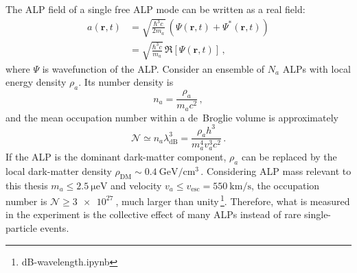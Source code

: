 The ALP field of a single free ALP mode can be written as a real field: 
\begin{align}
     a(\mathbf{r},t)
     &=\sqrt{\frac{\hbar^3c}{2 m_a}}\,
      \left(\Psi(\mathbf{r},t) + \Psi^*(\mathbf{r},t)\right)\\
    &=\sqrt{\frac{\hbar^3c}{m_a}}\,
      \Re\left[\Psi(\mathbf{r},t)\right]
    \,,\label{eq:ALP_single_wavefunction}
\end{align}
where $\Psi$ is wavefunction of the ALP. 
Consider an ensemble of $N_a$ ALPs with local energy density $\rho_a$.
Its number density is
\begin{equation}
    n_a=\frac{\rho_a}{m_a c^2}
    \,,\label{eq:na}
\end{equation}
and the mean occupation number within a de~Broglie volume is approximately
\begin{equation}
    \mathcal{N}\simeq n_a\lambda_{\mathrm{dB}}^3
    =\frac{\rho_a h^3}{m_a^4 v_a^3 c^2}
    \,.\label{eq:occupation}
\end{equation}
If the ALP is the dominant dark-matter component, $\rho_a$ can be replaced by the local dark-matter density $\rho_\mathrm{DM} \sim \SI{0.4}{\GeV/\cm^3}$\,\cite{Evans2019_SHMRefined}. 
Considering ALP mass relevant to this thesis $m_a \leq \SI{2.5}{\micro\electronvolt}$ and velocity $v_a \leq v_\mathrm{esc} = \SI{550}{\km/\s}$, the occupation number is $\mathcal{N} \geq \SI{3e27}{}$, much larger than unity\,\footnote{dB-wavelength.ipynb}.
Therefore, what is measured in the experiment is the collective effect of many ALPs instead of rare single-particle events. 

